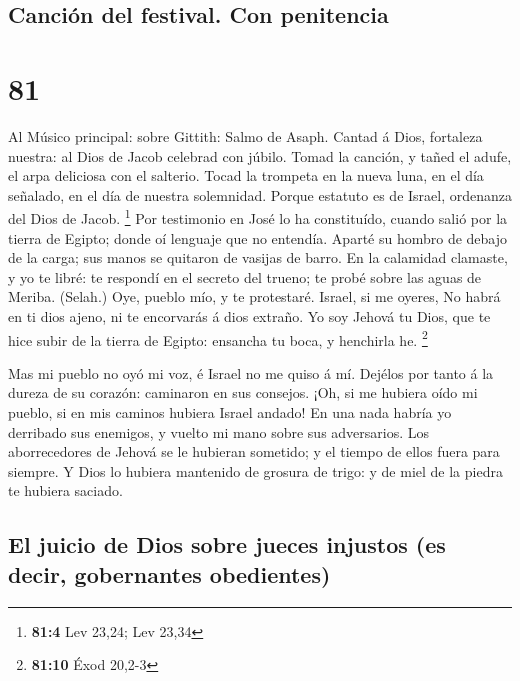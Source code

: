 \hypertarget{canciuxf3n-del-festival.-con-penitencia}{%
\subsection{Canción del festival. Con
penitencia}\label{canciuxf3n-del-festival.-con-penitencia}}

\hypertarget{section-80}{%
\section{81}\label{section-80}}

 Al Músico principal: sobre Gittith: Salmo de Asaph. Cantad
á Dios, fortaleza nuestra: al Dios de Jacob celebrad con júbilo.
 Tomad la canción, y tañed el adufe, el arpa deliciosa con
el salterio.  Tocad la trompeta en la nueva luna, en el día
señalado, en el día de nuestra solemnidad.  Porque estatuto
es de Israel, ordenanza del Dios de Jacob. \footnote{\textbf{81:4} Lev
  23,24; Lev 23,34}  Por testimonio en José lo ha
constituído, cuando salió por la tierra de Egipto; donde oí lenguaje que
no entendía.  Aparté su hombro de debajo de la carga; sus
manos se quitaron de vasijas de barro.  En la calamidad
clamaste, y yo te libré: te respondí en el secreto del trueno; te probé
sobre las aguas de Meriba. (Selah.)  Oye, pueblo mío, y te
protestaré. Israel, si me oyeres,  No habrá en ti dios
ajeno, ni te encorvarás á dios extraño.  Yo soy Jehová tu
Dios, que te hice subir de la tierra de Egipto: ensancha tu boca, y
henchirla he. \footnote{\textbf{81:10} Éxod 20,2-3}

 Mas mi pueblo no oyó mi voz, é Israel no me quiso á mí.
 Dejélos por tanto á la dureza de su corazón: caminaron en
sus consejos.  ¡Oh, si me hubiera oído mi pueblo, si en mis
caminos hubiera Israel andado!  En una nada habría yo
derribado sus enemigos, y vuelto mi mano sobre sus adversarios.
 Los aborrecedores de Jehová se le hubieran sometido; y el
tiempo de ellos fuera para siempre.  Y Dios lo hubiera
mantenido de grosura de trigo: y de miel de la piedra te hubiera
saciado.

\hypertarget{el-juicio-de-dios-sobre-jueces-injustos-es-decir-gobernantes-obedientes}{%
\subsection{El juicio de Dios sobre jueces injustos (es decir,
gobernantes
obedientes)}\label{el-juicio-de-dios-sobre-jueces-injustos-es-decir-gobernantes-obedientes}}

